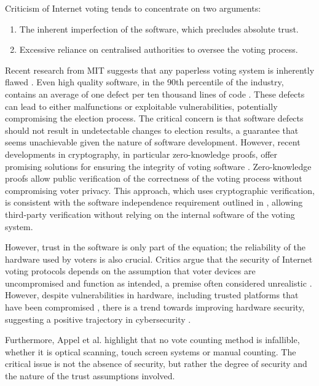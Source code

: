 \documentclass[runningheads]{llncs}
\begin{document}
Criticism of Internet voting tends to concentrate on two arguments:

\begin{enumerate}
\item The inherent imperfection of the software, which precludes absolute trust.
\item Excessive reliance on centralised authorities to oversee the voting process.
\end{enumerate}

Recent research from MIT suggests that any paperless voting system is inherently flawed \cite{parkGoingBadWorse2021}. Even high quality software, in the 90th percentile of the industry, contains an average of one defect per ten thousand lines of code \cite{llaguno2017CoverityScan2017}. These defects can lead to either malfunctions or exploitable vulnerabilities, potentially compromising the election process. The critical concern is that software defects should not result in undetectable changes to election results, a guarantee that seems unachievable given the nature of software development.
However, recent developments in cryptography, in particular zero-knowledge proofs, offer promising solutions for ensuring the integrity of voting software \cite{parnoPinocchioNearlyPractical2013}. Zero-knowledge proofs allow public verification of the correctness of the voting process without compromising voter privacy. This approach, which uses cryptographic verification, is consistent with the software independence requirement outlined in \cite{parkGoingBadWorse2021}, allowing third-party verification without relying on the internal software of the voting system.

However, trust in the software is only part of the equation; the reliability of the hardware used by voters is also crucial. Critics argue that the security of Internet voting protocols depends on the assumption that voter devices are uncompromised and function as intended, a premise often considered unrealistic \cite{parkGoingBadWorse2021}. However, despite vulnerabilities in hardware, including trusted platforms that have been compromised \cite{goodinIntelSGXVulnerable2020, IntelSGXBroken2019, bulckForeshadowExtractingKeys}, there is a trend towards improving hardware security, suggesting a positive trajectory in cybersecurity \cite{golombBelieveItCybersecurity2018}.

Furthermore, Appel et al. \cite{appelEvidenceBasedElectionsCreate2019} highlight that no vote counting method is infallible, whether it is optical scanning, touch screen systems or manual counting. The critical issue is not the absence of security, but rather the degree of security and the nature of the trust assumptions involved.
\end{document}
